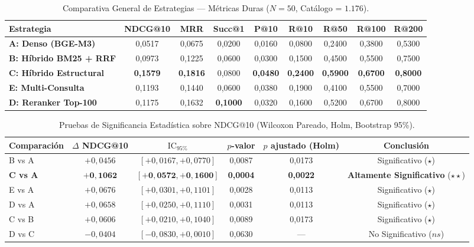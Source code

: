 \documentclass[11pt,a4paper]{article}
\begin{document}
\begin{table}[htbp]
\centering
\small
\setlength{\tabcolsep}{4.5pt}
\caption{Comparativa General de Estrategias --- Métricas Duras ($N=50$, Catálogo = $1.176$).}
\label{tab:metricas_duras}
\begin{tabularx}{\textwidth}{lcccccccc}
\toprule
\textbf{Estrategia} & \textbf{NDCG@10} & \textbf{MRR} & \textbf{Succ@1} & \textbf{P@10} & \textbf{R@10} & \textbf{R@50} & \textbf{R@100} & \textbf{R@200} \\
\midrule
\textbf{A: Denso (BGE-M3)} & 0{,}0517 & 0{,}0675 & 0{,}0200 & 0{,}0160 & 0{,}0800 & 0{,}2400 & 0{,}3800 & 0{,}5300 \\
\textbf{B: Híbrido BM25 + RRF} & 0{,}0973 & 0{,}1225 & 0{,}0600 & 0{,}0300 & 0{,}1500 & 0{,}4500 & 0{,}5500 & 0{,}7500 \\
\textbf{C: Híbrido Estructural} & \textbf{0{,}1579} & \textbf{0{,}1816} & 0{,}0800 & \textbf{0{,}0480} & \textbf{0{,}2400} & \textbf{0{,}5900} & \textbf{0{,}6700} & \textbf{0{,}8000} \\
\textbf{E: Multi-Consulta} & 0{,}1193 & 0{,}1440 & 0{,}0600 & 0{,}0380 & 0{,}1900 & 0{,}4100 & 0{,}5500 & 0{,}7000 \\
\textbf{D: Reranker Top-100} & 0{,}1175 & 0{,}1632 & \textbf{0{,}1000} & 0{,}0320 & 0{,}1600 & 0{,}5200 & 0{,}6700 & 0{,}8000 \\
\bottomrule
\end{tabularx}
\end{table}

\begin{table}[htbp]
\centering
\small
\setlength{\tabcolsep}{5pt}
\caption{Pruebas de Significancia Estadística sobre NDCG@10 (Wilcoxon Pareado, Holm, Bootstrap 95\%).}
\label{tab:significancia}
\begin{tabularx}{\textwidth}{lccccc}
\toprule
\textbf{Comparación} & $\Delta$ \textbf{NDCG@10} & $\text{IC}_{95\%}$ & $p$-valor & $p$ \textbf{ajustado (Holm)} & \textbf{Conclusión} \\
\midrule
B vs A & $+0{,}0456$ & $[+0{,}0167, +0{,}0770]$ & 0{,}0087 & 0{,}0173 & Significativo ($\star$) \\
\textbf{C vs A} & $\mathbf{+0{,}1062}$ & $[\mathbf{+0{,}0572, +0{,}1600}]$ & \textbf{0{,}0004} & \textbf{0{,}0022} & \textbf{Altamente Significativo} ($\star\star$) \\
E vs A & $+0{,}0676$ & $[+0{,}0301, +0{,}1101]$ & 0{,}0028 & 0{,}0113 & Significativo ($\star$) \\
D vs A & $+0{,}0658$ & $[+0{,}0250, +0{,}1110]$ & 0{,}0031 & 0{,}0113 & Significativo ($\star$) \\
C vs B & $+0{,}0606$ & $[+0{,}0210, +0{,}1040]$ & 0{,}0089 & 0{,}0173 & Significativo ($\star$) \\
D vs C & $-0{,}0404$ & $[-0{,}0830, +0{,}0010]$ & 0{,}0630 & --- & No Significativo ($ns$) \\
\bottomrule
\end{tabularx}
\end{table}
\end{document}
